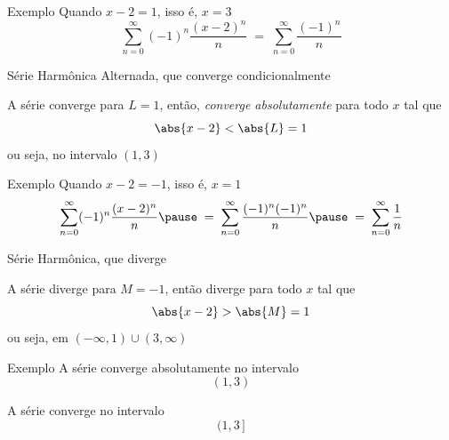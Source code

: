 \begin{frame}{Exemplo \theexemplo}
  Quando \(x-2=1\), isso é, \(x=3\)
  \pause
  \[
    \sum_{n=0}^\infty (-1)^n\frac{(x-2)^n}{n}
    \;=\;
    \sum_{n=0}^\infty \frac{(-1)^n}{n}
  \]

  \pause
  Série Harmônica Alternada, que converge condicionalmente

  \pause
  \vspace{\baselineskip}
  A série converge para
  \( L = 1 \)\pause,
  então, \emph{converge absolutamente} para todo \(x\) tal que
  \[
    \abs{x-2} < \abs{L} = 1
  \]
  \pause
  ou seja, no intervalo
  \(
    (1, 3)
  \)
\end{frame}

\begin{frame}{Exemplo \theexemplo}
  Quando \(x-2=-1\), isso é, \(x=1\)
  \pause
  \[
    \sum_{n=0}^\infty (-1)^n\frac{(x-2)^n}{n}
    \pause
    \;=\;
    \sum_{n=0}^\infty \frac{(-1)^n(-1)^n}{n}
    \pause
    \;=\;
    \sum_{n=0}^\infty \frac{1}{n}
  \]

  \pause
  Série Harmônica, que diverge

  \pause
  \vspace{\baselineskip}
  A série diverge para
  \( M = -1 \)\pause,
  então diverge para todo \(x\) tal que
  \[
    \abs{x-2} > \abs{M} = 1
  \]
  \pause
  ou seja, em
  \(
    (-\infty, 1) \cup (3, \infty)
  \)
\end{frame}

\begin{frame}{Exemplo \theexemplo}
  A série converge absolutamente no intervalo
  \[
    (1, 3)
  \]

  \pause
  A série converge no intervalo
  \[
    (1, 3\,]
  \]
\end{frame}

